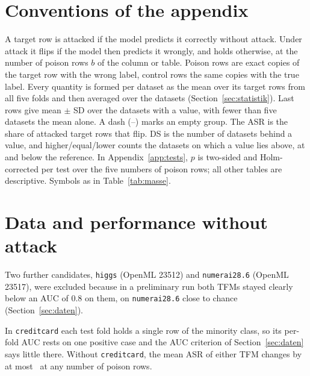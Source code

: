 \providecommand{\nurde}[1]{#1}%
\renewcommand{\thetable}{\Alph{section}\arabic{table}}
\renewcommand{\thefigure}{\Alph{section}\arabic{figure}}
\newcommand{\tabelle}[2]{\begin{table}[H]\centering\scriptsize\caption{#2}\label{tab:#1}\end{table}}
\newcommand{\tabelletfm}[2]{\begin{table}[H]\centering\scriptsize\caption{#2}\label{tab:#1}\end{table}}

\section*{Conventions of the appendix}
A target row is attacked if the model predicts it correctly without attack. Under attack it flips if the model then
predicts it wrongly, and holds otherwise, at the number of poison rows $b$ of the column or table. Poison rows are exact
copies of the target row with the wrong label, control rows the same copies with the true label. Every quantity is
formed per dataset as the mean over its target rows from all five folds and then averaged over the datasets (Section~\ref{sec:statistik}).
Last rows give mean $\pm$ SD over the datasets with a value, with fewer than five datasets the mean alone. A dash (--)
marks an empty group. The ASR is the share of attacked target rows that flip. DS is the number of datasets behind a
value, and higher/equal/lower counts the datasets on which a value lies above, at and below the reference. In
Appendix~\ref{app:tests}, $p$ is two-sided and Holm-corrected per test over the five numbers of poison rows; all other
tables are descriptive. Symbols as in Table~\ref{tab:masse}.

\section{Data and performance without attack}\label{app:daten}\label{app:datensaetze}\label{app:guete}
\noindent Two further candidates, \texttt{higgs} (OpenML 23512) and
\texttt{numerai28.6} (OpenML 23517), were excluded because in a
preliminary run both TFMs stayed clearly below an AUC of 0.8 on them,
on \texttt{numerai28.6} close to chance (Section~\ref{sec:daten}).

\noindent{\sloppy\par}

\noindent In \texttt{creditcard} each test fold holds a single row of the minority class, so its per-fold AUC rests on one positive case and the AUC criterion of Section~\ref{sec:daten} says little there. Without \texttt{creditcard}, the mean ASR of either TFM changes by at most \zOhneCreditMax\ at any number of poison rows.

